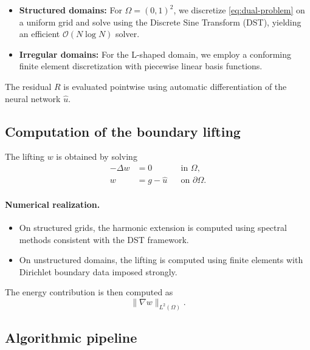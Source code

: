 \begin{itemize}
\item \textbf{Structured domains:}
For $\Omega = (0,1)^2$, we discretize \eqref{eq:dual-problem}
on a uniform grid and solve using the Discrete Sine Transform (DST),
yielding an efficient $\mathcal{O}(N \log N)$ solver.

\item \textbf{Irregular domains:}
For the L-shaped domain, we employ a conforming finite element
discretization with piecewise linear basis functions.

\end{itemize}

The residual $R$ is evaluated pointwise using automatic differentiation
of the neural network $\hat{u}$.

\subsection{Computation of the boundary lifting}

The lifting $w$ is obtained by solving
\begin{equation}\label{eq:lifting-compute}
\begin{aligned}
- \Delta w &= 0 && \text{in } \Omega,\\
w &= g - \hat{u} && \text{on } \partial\Omega.
\end{aligned}
\end{equation}

\paragraph{Numerical realization.}

\begin{itemize}
\item On structured grids, the harmonic extension is computed using
spectral methods consistent with the DST framework.

\item On unstructured domains, the lifting is computed using finite
elements with Dirichlet boundary data imposed strongly.
\end{itemize}

The energy contribution is then computed as
\begin{equation}
\|\nabla w\|_{L^2(\Omega)}.
\end{equation}

\subsection{Algorithmic pipeline}

